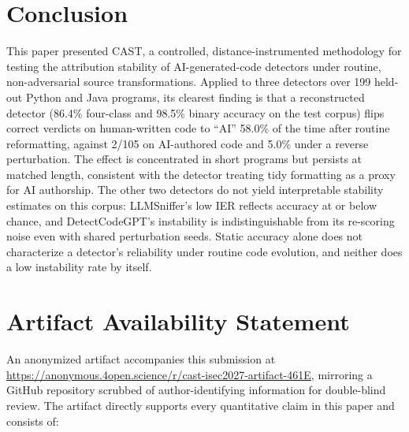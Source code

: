 \documentclass[sigconf,review,anonymous]{acmart}
\begin{document}
\section{Conclusion}

This paper presented CAST, a controlled, distance-instrumented methodology for testing the attribution stability of AI-generated-code detectors under routine, non-adversarial source transformations. Applied to three detectors over 199 held-out Python and Java programs, its clearest finding is that a reconstructed detector (86.4\% four-class and 98.5\% binary accuracy on the test corpus) flips correct verdicts on human-written code to ``AI'' 58.0\% of the time after routine reformatting, against 2/105 on AI-authored code and 5.0\% under a reverse perturbation. The effect is concentrated in short programs but persists at matched length, consistent with the detector treating tidy formatting as a proxy for AI authorship. The other two detectors do not yield interpretable stability estimates on this corpus: LLMSniffer's low IER reflects accuracy at or below chance, and DetectCodeGPT's instability is indistinguishable from its re-scoring noise even with shared perturbation seeds. Static accuracy alone does not characterize a detector's reliability under routine code evolution, and neither does a low instability rate by itself.

\section*{Artifact Availability Statement}

An anonymized artifact accompanies this submission at \url{https://anonymous.4open.science/r/cast-isec2027-artifact-461E}, mirroring a GitHub repository scrubbed of author-identifying information for double-blind review. The artifact directly supports every quantitative claim in this paper and consists of:
\end{document}
